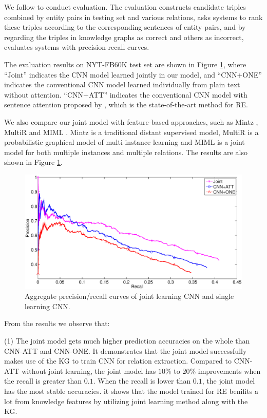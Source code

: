 \documentclass[11pt,a4paper]{article}
\begin{document}
We follow \cite{weston2013connecting} to conduct evaluation. The evaluation constructs candidate triples combined by entity pairs in testing set and various relations, asks systems to rank these triples according to the corresponding sentences of entity pairs, and by regarding the triples in knowledge graphs as correct and others as incorrect, evaluates systems with precision-recall curves.

The evaluation results on NYT-FB60K test set are shown in Figure \ref{fig:jointcnn}, where ``Joint'' indicates the CNN model learned jointly in our model, and ``CNN+ONE'' indicates the conventional CNN model learned individually from plain text without attention. ``CNN+ATT'' indicates the conventional CNN model with sentence attention proposed by \cite{lin2016neural}, which is the state-of-the-art method for RE. 

We also compare our joint model with feature-based approaches, such as Mintz \cite{mintz2009distant}, MultiR \cite{hoffmann2011knowledge} and MIML \cite{surdeanu2012multi}. Mintz is a traditional distant supervised model, MultiR is a probabilistic graphical model of multi-instance learning and MIML is a joint model for both multiple instances and multiple relations. The results are also shown in Figure \ref{fig:jointcnn}.
\begin{figure}[h]
\centering
\includegraphics[width=1\columnwidth]{jointcnn.eps}
\caption{Aggregate precision/recall curves of joint learning CNN and single learning CNN.}
\label{fig:jointcnn}
\end{figure} 

From the results we observe that: 

(1) The joint model gets much higher prediction accuracies on the whole than CNN-ATT and CNN-ONE. It demonstrates that the joint model successfully makes use of the KG to train CNN for relation extraction. Compared to CNN-ATT without joint learning, the joint model has $10\%$ to $20\%$ improvements when the recall is greater than $0.1$. When the recall is lower than $0.1$, the joint model has the most stable accuracies. it shows that the model trained for RE benifits a lot from knowledge features by utilizing joint learning method along with the KG.
\end{document}

